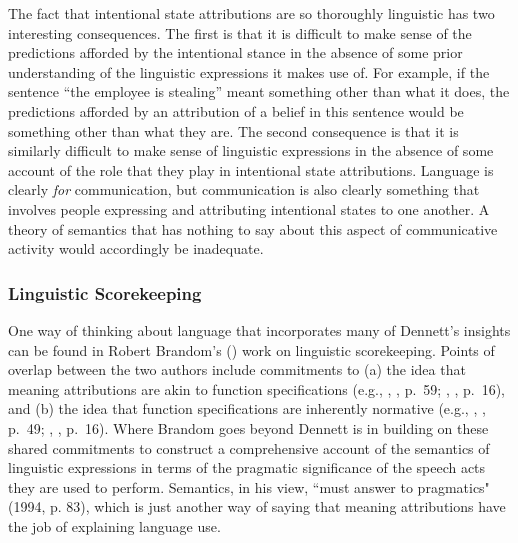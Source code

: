 The fact that intentional state attributions are so thoroughly linguistic has two interesting consequences. The first is that it is difficult to make sense of the predictions afforded by the intentional stance in the absence of some prior understanding of the linguistic expressions it makes use of. For example, if the sentence ``the employee is stealing'' meant something other than what it does, the predictions afforded by an attribution of a belief in this sentence would be something other than what they are. The second consequence is that it is similarly difficult to make sense of linguistic expressions in the absence of some account of the role that they play in intentional state attributions. Language is clearly \textit{for} communication, but communication is also clearly something that involves people expressing and attributing intentional states to one another. A theory of semantics that has nothing to say about this aspect of communicative activity would accordingly be inadequate. 

\subsubsection{Linguistic Scorekeeping}

One way of thinking about language that incorporates many of Dennett's insights can be found in Robert Brandom's (\citeyear{Brandom:1994}) work on linguistic scorekeeping. Points of overlap between the two authors include commitments to (a) the idea that meaning attributions are akin to function specifications (e.g., \citeauthor{Dennett:1987}, \citeyear{Dennett:1987}, p.~59; \citeauthor{Brandom:1994}, \citeyear{Brandom:1994}, p.~16), and (b) the idea that function specifications are inherently normative (e.g., \citeauthor{Dennett:1987}, \citeyear{Dennett:1987}, p.~49; \citeauthor{Brandom:1994}, \citeyear{Brandom:1994}, p.~16). Where Brandom goes beyond Dennett is in building on these shared commitments to construct a comprehensive account of the semantics of linguistic expressions in terms of the pragmatic significance of the speech acts they are used to perform. Semantics, in his view, ``must answer to pragmatics" (1994, p. 83), which is just another way of saying that meaning attributions have the job of explaining language use. 

